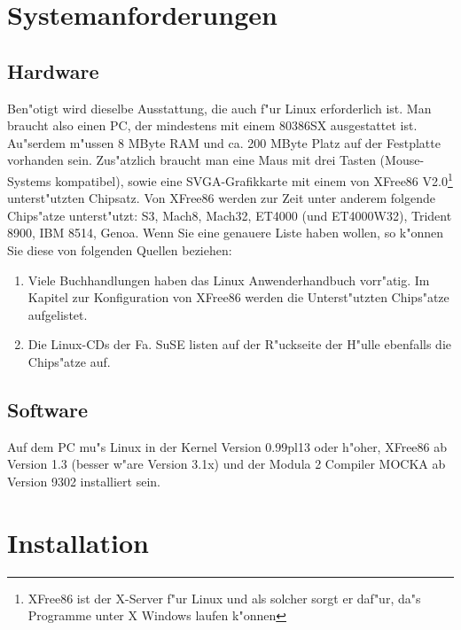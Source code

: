 %
%





\section{Systemanforderungen}




\subsection{Hardware}
Ben"otigt wird dieselbe Ausstattung, die auch f"ur Linux erforderlich ist.
Man braucht also einen PC, der mindestens mit einem 80386SX ausgestattet ist.
Au"serdem m"ussen 8 MByte RAM und ca. 200 MByte Platz auf der Festplatte
vorhanden sein.
Zus"atzlich braucht man eine Maus mit drei Tasten (Mouse-Systems kompatibel),
%
%
sowie eine SVGA-Grafikkarte mit einem von XFree86 V2.0\footnote[1]{XFree86 ist
der X-Server f"ur Linux und als solcher sorgt er daf"ur, da"s Programme unter
X Windows laufen k"onnen} unterst"utzten Chipsatz.
%
%
Von XFree86 werden zur Zeit unter anderem folgende Chips"atze
unterst"utzt: S3, Mach8, Mach32, ET4000 (und ET4000W32), Trident 8900, IBM 8514, Genoa. Wenn Sie eine genauere Liste haben wollen, so k"onnen Sie diese von
folgenden Quellen beziehen:
\begin{enumerate}
\item{Viele Buchhandlungen haben das Linux Anwenderhandbuch vorr"atig. Im
Kapitel zur Konfiguration von XFree86 werden die Unterst"utzten Chips"atze
aufgelistet.}
\item{Die Linux-CDs der Fa. SuSE listen auf der R"uckseite der H"ulle ebenfalls
die Chips"atze auf.}
\end{enumerate}




\subsection{Software}
Auf dem PC mu"s Linux in der Kernel Version 0.99pl13 oder h"oher,
XFree86 ab Version 1.3 (besser w"are Version 3.1x) und der Modula 2
Compiler MOCKA ab Version 9302 installiert sein.




\section{Installation}
%
%



